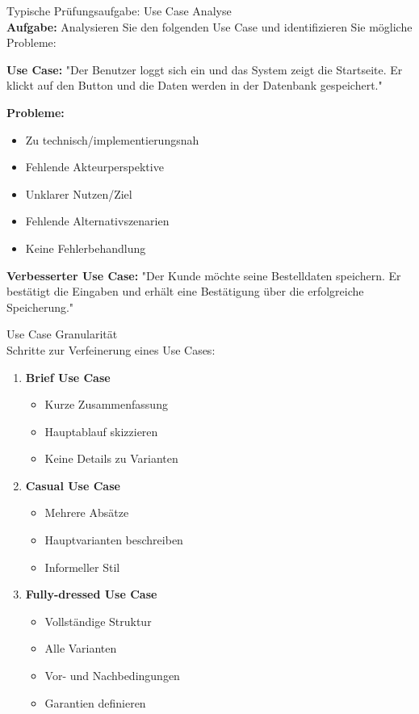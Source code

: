 \begin{example2}{Typische Prüfungsaufgabe: Use Case Analyse}\\
\textbf{Aufgabe:} Analysieren Sie den folgenden Use Case und identifizieren Sie mögliche Probleme:

\textbf{Use Case:} "Der Benutzer loggt sich ein und das System zeigt die Startseite. Er klickt auf den Button und die Daten werden in der Datenbank gespeichert."

\textbf{Probleme:}
\begin{itemize}
    \item Zu technisch/implementierungsnah
    \item Fehlende Akteurperspektive
    \item Unklarer Nutzen/Ziel
    \item Fehlende Alternativszenarien
    \item Keine Fehlerbehandlung
\end{itemize}

\textbf{Verbesserter Use Case:}
"Der Kunde möchte seine Bestelldaten speichern. Er bestätigt die Eingaben und erhält eine Bestätigung über die erfolgreiche Speicherung."
\end{example2}

\begin{concept}{Use Case Granularität}\\
Schritte zur Verfeinerung eines Use Cases:
\begin{enumerate}
    \item \textbf{Brief Use Case}
    \begin{itemize}
        \item Kurze Zusammenfassung
        \item Hauptablauf skizzieren
        \item Keine Details zu Varianten
    \end{itemize}
    \item \textbf{Casual Use Case}
    \begin{itemize}
        \item Mehrere Absätze
        \item Hauptvarianten beschreiben
        \item Informeller Stil
    \end{itemize}
    \item \textbf{Fully-dressed Use Case}
    \begin{itemize}
        \item Vollständige Struktur
        \item Alle Varianten
        \item Vor- und Nachbedingungen
        \item Garantien definieren
    \end{itemize}
\end{enumerate}
\end{concept}

